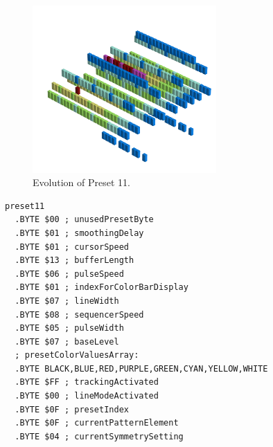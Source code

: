 \clearpage
\begin{minipage}[b]{0.48\linewidth}
\begin{figure}[H]                                                          
  \centering                                                             
  \begin{adjustbox}{width=7cm,center}                                   
  \includegraphics[width=7cm]{src/presets/pattern11-45.png}%
  \end{adjustbox}                                                        
\caption{Evolution of Preset 11.}                                           
\end{figure}                                                               
                                                                 
                                                                           
\end{minipage}
\hspace{0.1cm}
\begin{minipage}[b]{0.48\linewidth}                                       
\begin{lstlisting}[basicstyle=\ttfamily\scriptsize,caption=Data structure for Preset 11.]
preset11
  .BYTE $00 ; unusedPresetByte
  .BYTE $01 ; smoothingDelay
  .BYTE $01 ; cursorSpeed
  .BYTE $13 ; bufferLength
  .BYTE $06 ; pulseSpeed
  .BYTE $01 ; indexForColorBarDisplay
  .BYTE $07 ; lineWidth
  .BYTE $08 ; sequencerSpeed
  .BYTE $05 ; pulseWidth
  .BYTE $07 ; baseLevel
  ; presetColorValuesArray: 
  .BYTE BLACK,BLUE,RED,PURPLE,GREEN,CYAN,YELLOW,WHITE
  .BYTE $FF ; trackingActivated
  .BYTE $00 ; lineModeActivated
  .BYTE $0F ; presetIndex
  .BYTE $0F ; currentPatternElement
  .BYTE $04 ; currentSymmetrySetting
\end{lstlisting}
\end{minipage}

